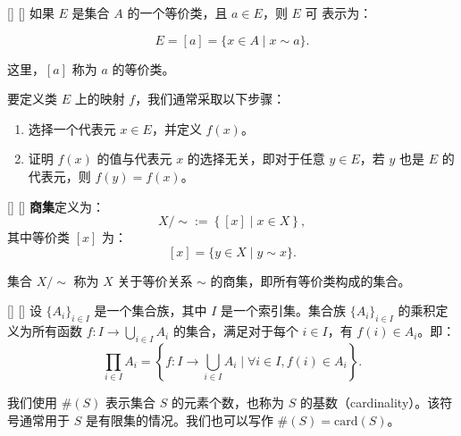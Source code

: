 \documentclass[UTF8]{ctexart}
\begin{document}
        \begin{dfn}
            []
            {}
            []
            []
                如果 \( E \) 是集合 \( A \) 的一个等价类，且 \( a \in E \)，则 \( E \) 可
            表示为：

            \[
            E = [a] = \{ x \in A \mid x \sim a \}.
            \]

                这里，\([a]\) 称为 \( a \) 的等价类。
       \end{dfn}

        要定义类 \( E \) 上的映射 \( f \)，我们通常采取以下步骤：
        \begin{enumerate}
            \item 选择一个代表元 \( x \in E \)，并定义 \( f(x) \)。
            \item 证明 \( f(x) \) 的值与代表元 \( x \) 的选择无关，即对于任意 \( y \in E \)，若 \( y \) 也是 \( E \) 的代表元，则 \( f(y) = f(x) \)。
        \end{enumerate}

        \begin{dfn}
            []
            {}
            []
            []
            \textbf{商集}定义为：
                \[
                X / {\sim} := \left\{ [x] \mid x \in X \right\},
                \]
                其中等价类 \([x]\) 为：
                \[
                [x] = \{ y \in X \mid y \sim x \}.
                \]

                集合 \( X / \sim \) 称为 \( X \) 关于等价关系 \( \sim \) 的商集，即所有等价类构成的集合。

       \end{dfn}   

        \begin{dfn}
            []
            {}
            []
            []
            设 \( \{A_i\}_{i \in I} \) 是一个集合族，其中 \( I \) 是一个索引集。集合族 \( \{A_i\}_{i \in I} \) 的乘积定义为所有函数 \( f: I \to \bigcup_{i \in I} A_i \) 的集合，满足对于每个 \( i \in I \)，有 \( f(i) \in A_i \)。即：
            \[
			\prod_{i \in I} A_i = \left\{ f: I \to \bigcup_{i \in I} A_i \mid \forall i \in I, f(i) \in A_i \right\}. 
            \]
       \end{dfn}

        我们使用 \(\#(S)\) 表示集合 \(S\) 的元素个数，也称为 \(S\) 的基数（cardinality）。该符号通常用于 \(S\) 是有限集的情况。我们也可以写作 \(\#(S) = \mathrm{card}(S)\)。
\end{document}
